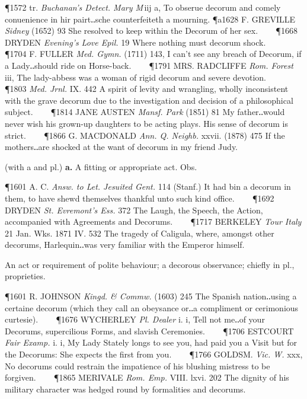 \begin{description}[wide, labelwidth=!, labelindent=0pt]
\begin{myenumerate}
\P 1572 tr.  \textit{Buchanan's Detect. Mary M} iij a, To obserue decorum and comely conuenience in hir pairt‥sche counterfeiteth a mourning.
\P a1628 F. GREVILLE  \textit{Sidney} (1652) 93 She resolved to keep within the Decorum of her sex.    
\P 1668 DRYDEN  \textit{Evening's Love Epil.} 19 Where nothing must decorum shock.    
\P 1704 F. FULLER  \textit{Med. Gymn.} (1711) 143, I can't see any breach of Decorum, if a Lady‥should ride on Horse-back.    
\P 1791 MRS. RADCLIFFE  \textit{Rom. Forest} iii, The lady-abbess was a woman of rigid decorum and severe devotion.    
\P 1803  \textit{Med. Jrnl.} IX. 442 A spirit of levity and wrangling, wholly inconsistent with the grave decorum due to the investigation and decision of a philosophical subject.    
\P 1814 JANE AUSTEN  \textit{Mansf. Park} (1851) 81 My father‥would never wish his grown-up daughters to be acting plays. His sense of decorum is strict.    
\P 1866 G. MACDONALD  \textit{Ann. Q. Neighb.} xxvii. (1878) 475 If the mothers‥are shocked at the want of decorum in my friend Judy.

 (with a and pl.) \textbf{a.} A fitting or appropriate act. Obs.

\P 1601 A. C. \textit{Answ. to Let. Jesuited Gent.} 114 (Stanf.) It had bin a decorum in them, to have shewd themselves thankful unto such kind office.    
\P 1692 DRYDEN  \textit{St. Evremont's Ess.} 372 The Laugh, the Speech, the Action, accompanied with Agreements and Decorums.    
\P 1717 BERKELEY  \textit{Tour Italy} 21 Jan. Wks. 1871 IV. 532  The tragedy of Caligula, where, amongst other decorums, Harlequin‥was very familiar with the Emperor himself.

 An act or requirement of polite behaviour; a decorous observance; chiefly in pl., proprieties.

\P 1601 R. JOHNSON  \textit{Kingd. \& Commw.} (1603) 245 The Spanish nation‥using a certaine decorum (which they call an obeysance or‥a compliment or cerimonious curtesie).    
\P 1676 WYCHERLEY  \textit{Pl. Dealer} i. i, Tell not me‥of your Decorums, supercilious Forms, and slavish Ceremonies.    
\P 1706 ESTCOURT  \textit{Fair Examp.} i. i, My Lady Stately longs to see you, had paid you a Visit but for the Decorums: She expects the first from you.    
\P 1766 GOLDSM.  \textit{Vic. W.} xxx, No decorums could restrain the impatience of his blushing mistress to be forgiven.    
\P 1865 MERIVALE  \textit{Rom. Emp.} VIII. lxvi. 202 The dignity of his military character was hedged round by formalities and decorums.
\end{myenumerate}



\end{description}

